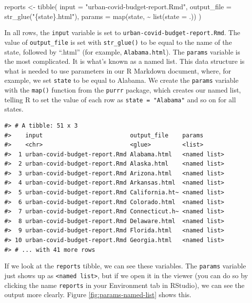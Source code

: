 \documentclass[
]{book}
\newenvironment{Shaded}{\begin{snugshade}}{\end{snugshade}}
\newcommand{\AttributeTok}[1]{\textcolor[rgb]{0.77,0.63,0.00}{#1}}
\newcommand{\FunctionTok}[1]{\textcolor[rgb]{0.00,0.00,0.00}{#1}}
\newcommand{\NormalTok}[1]{#1}
\newcommand{\OtherTok}[1]{\textcolor[rgb]{0.56,0.35,0.01}{#1}}
\newcommand{\SpecialCharTok}[1]{\textcolor[rgb]{0.00,0.00,0.00}{#1}}
\newcommand{\StringTok}[1]{\textcolor[rgb]{0.31,0.60,0.02}{#1}}
\begin{document}
\begin{Shaded}
\begin{Highlighting}[]
\NormalTok{reports }\OtherTok{\textless{}{-}} \FunctionTok{tibble}\NormalTok{(}
\AttributeTok{input =} \StringTok{"urban{-}covid{-}budget{-}report.Rmd"}\NormalTok{,}
\AttributeTok{output\_file =} \FunctionTok{str\_glue}\NormalTok{(}\StringTok{"\{state\}.html"}\NormalTok{),}
\AttributeTok{params =} \FunctionTok{map}\NormalTok{(state, }\SpecialCharTok{\textasciitilde{}} \FunctionTok{list}\NormalTok{(}\AttributeTok{state =}\NormalTok{ .))}
\NormalTok{)}
\end{Highlighting}
\end{Shaded}

In all rows, the \texttt{input} variable is set to \texttt{urban-covid-budget-report.Rmd}. The value of \texttt{output\_file} is set with \texttt{str\_glue()} to be equal to the name of the state, followed by ``.html'' (for example, \texttt{Alabama.html}). The \texttt{params} variable is the most complicated. It is what's known as a named list. This data structure is what is needed to use parameters in our R Markdown document, where, for example, we set \texttt{state} to be equal to Alabama. We create the \texttt{params} variable with the \texttt{map()} function from the \texttt{purrr} package, which creates our named list, telling R to set the value of each row as \texttt{state\ =\ "Alabama"} and so on for all states.

\begin{verbatim}
#> # A tibble: 51 x 3
#>    input                         output_file    params      
#>    <chr>                         <glue>         <list>      
#>  1 urban-covid-budget-report.Rmd Alabama.html   <named list>
#>  2 urban-covid-budget-report.Rmd Alaska.html    <named list>
#>  3 urban-covid-budget-report.Rmd Arizona.html   <named list>
#>  4 urban-covid-budget-report.Rmd Arkansas.html  <named list>
#>  5 urban-covid-budget-report.Rmd California.ht~ <named list>
#>  6 urban-covid-budget-report.Rmd Colorado.html  <named list>
#>  7 urban-covid-budget-report.Rmd Connecticut.h~ <named list>
#>  8 urban-covid-budget-report.Rmd Delaware.html  <named list>
#>  9 urban-covid-budget-report.Rmd Florida.html   <named list>
#> 10 urban-covid-budget-report.Rmd Georgia.html   <named list>
#> # ... with 41 more rows
\end{verbatim}

If we look at the \texttt{reports} tibble, we can see these variables. The \texttt{params} variable just shows up as \texttt{\textless{}named\ list\textgreater{}}, but if we open it in the viewer (you can do so by clicking the name \texttt{reports} in your Environment tab in RStudio), we can see the output more clearly. Figure \ref{fig:params-named-list} shows this.
\end{document}
